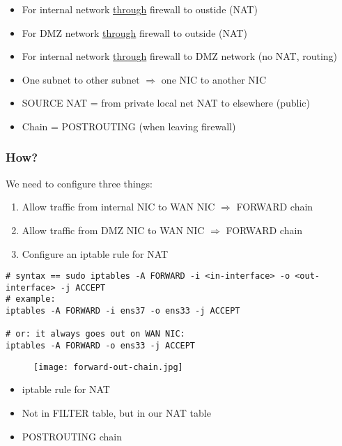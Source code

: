 \documentclass{article}
\begin{document}
\begin{itemize}
    \item For internal network \underline{through} firewall to oustide (NAT)
    \item For DMZ network \underline{through} firewall to outside (NAT)
    \item For internal network \underline{through} firewall to DMZ network (no NAT, routing)
    \item One subnet to other subnet $\Rightarrow$ one NIC to another NIC
    \item SOURCE NAT = from private local net NAT to elsewhere (public)
    \item Chain = POSTROUTING (when leaving firewall)
\end{itemize}

\subsubsection{How?}

We need to configure three things:

\begin{enumerate}
    \item Allow traffic from internal NIC to WAN NIC $\Rightarrow$ FORWARD chain
    \item Allow traffic from DMZ NIC to WAN NIC $\Rightarrow$ FORWARD chain
    \item Configure an iptable rule for NAT
\end{enumerate}

\begin{verbatim}
# syntax == sudo iptables -A FORWARD -i <in-interface> -o <out-interface> -j ACCEPT
# example: 
iptables -A FORWARD -i ens37 -o ens33 -j ACCEPT

# or: it always goes out on WAN NIC:
iptables -A FORWARD -o ens33 -j ACCEPT
\end{verbatim}

\begin{figure}[H]
    \centering
    \texttt{[image: forward-out-chain.jpg]}
\end{figure}

\begin{itemize}
    \item iptable rule for NAT
    \item Not in FILTER table, but in our NAT table
    \item POSTROUTING chain
\end{itemize}
\end{document}
